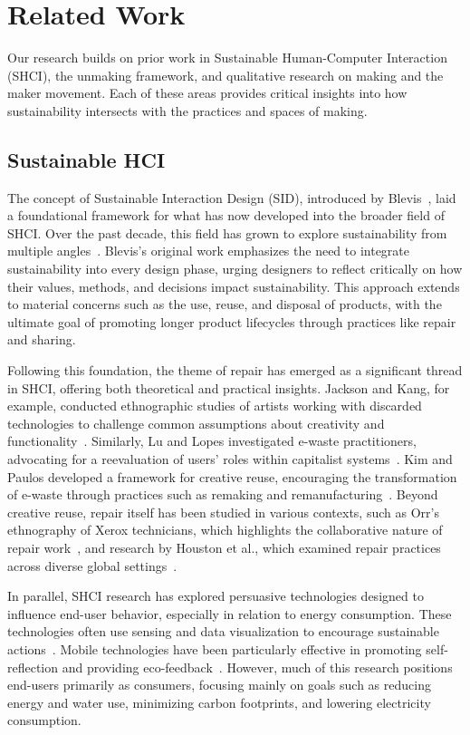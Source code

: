 \section{Related Work}
Our research builds on prior work in Sustainable Human-Computer Interaction (SHCI), the unmaking framework, and qualitative research on making and the maker movement. Each of these areas provides critical insights into how sustainability intersects with the practices and spaces of making.

\subsection{Sustainable HCI}

The concept of Sustainable Interaction Design (SID), introduced by Blevis~\cite{SID}, laid a foundational framework for what has now developed into the broader field of SHCI. 
Over the past decade, this field has grown to explore sustainability from multiple angles~\cite{10.1145/3411764.3445069, 10.1145/1753326.1753625}. Blevis’s original work emphasizes the need to integrate sustainability into every design phase, urging designers to reflect critically on how their values, methods, and decisions impact sustainability. 
This approach extends to material concerns such as the use, reuse, and disposal of products, with the ultimate goal of promoting longer product lifecycles through practices like repair and sharing.

Following this foundation, the theme of repair has emerged as a significant thread in SHCI, offering both theoretical and practical insights. Jackson and Kang, for example, conducted ethnographic studies of artists working with discarded technologies to challenge common assumptions about creativity and functionality~\cite{jackson2014breakdown}. Similarly, Lu and Lopes investigated e-waste practitioners, advocating for a reevaluation of users’ roles within capitalist systems~\cite{lu2024unmaking}. 
Kim and Paulos developed a framework for creative reuse, encouraging the transformation of e-waste through practices such as remaking and remanufacturing~\cite{kim2011practices}. 
Beyond creative reuse, repair itself has been studied in various contexts, such as Orr's ethnography of Xerox technicians, which highlights the collaborative nature of repair work~\cite{orr2016talking}, and research by Houston et al., which examined repair practices across diverse global settings~\cite{houston2016values}.


In parallel, SHCI research has explored persuasive technologies designed to influence end-user behavior, especially in relation to energy consumption. 
These technologies often use sensing and data visualization to encourage sustainable actions~\cite{10.1007/978-3-540-77006-0_7, 10.1145/3375182, 10.1145/1056808.1056932, 10.1145/3294109.3295634}. 
Mobile technologies have been particularly effective in promoting self-reflection and providing eco-feedback~\cite{10.1145/2786567.2795398, 10.1145/1753326.1753629, 10.1145/1518701.1518861}. 
However, much of this research positions end-users primarily as consumers, focusing mainly on goals such as reducing energy and water use, minimizing carbon footprints, and lowering electricity consumption.

